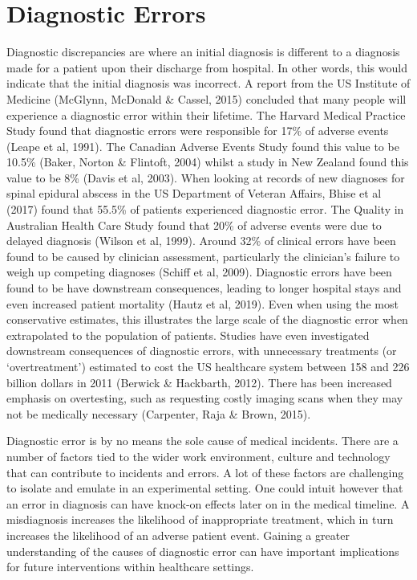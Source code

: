 \documentclass[a4paper, nobind]{templates/ociamthesis}
\begin{document}
\hypertarget{diagnostic-errors}{%
\section*{Diagnostic Errors}\label{diagnostic-errors}}

Diagnostic discrepancies are where an initial diagnosis is different to a diagnosis made for a patient upon their discharge from hospital. In other words, this would indicate that the initial diagnosis was incorrect. A report from the US Institute of Medicine (McGlynn, McDonald \& Cassel, 2015) concluded that many people will experience a diagnostic error within their lifetime. The Harvard Medical Practice Study found that diagnostic errors were responsible for 17\% of adverse events (Leape et al, 1991). The Canadian Adverse Events Study found this value to be 10.5\% (Baker, Norton \& Flintoft, 2004) whilst a study in New Zealand found this value to be 8\% (Davis et al, 2003). When looking at records of new diagnoses for spinal epidural abscess in the US Department of Veteran Affairs, Bhise et al (2017) found that 55.5\% of patients experienced diagnostic error. The Quality in Australian Health Care Study found that 20\% of adverse events were due to delayed diagnosis (Wilson et al, 1999). Around 32\% of clinical errors have been found to be caused by clinician assessment, particularly the clinician's failure to weigh up competing diagnoses (Schiff et al, 2009). Diagnostic errors have been found to be have downstream consequences, leading to longer hospital stays and even increased patient mortality (Hautz et al, 2019). Even when using the most conservative estimates, this illustrates the large scale of the diagnostic error when extrapolated to the population of patients. Studies have even investigated downstream consequences of diagnostic errors, with unnecessary treatments (or `overtreatment') estimated to cost the US healthcare system between 158 and 226 billion dollars in 2011 (Berwick \& Hackbarth, 2012). There has been increased emphasis on overtesting, such as requesting costly imaging scans when they may not be medically necessary (Carpenter, Raja \& Brown, 2015).

Diagnostic error is by no means the sole cause of medical incidents. There are a number of factors tied to the wider work environment, culture and technology that can contribute to incidents and errors. A lot of these factors are challenging to isolate and emulate in an experimental setting. One could intuit however that an error in diagnosis can have knock-on effects later on in the medical timeline. A misdiagnosis increases the likelihood of inappropriate treatment, which in turn increases the likelihood of an adverse patient event. Gaining a greater understanding of the causes of diagnostic error can have important implications for future interventions within healthcare settings.
\end{document}
